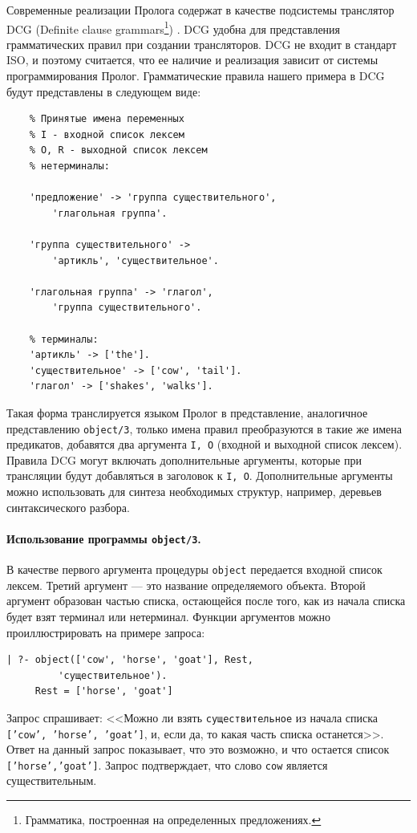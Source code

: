 \documentclass[12pt, openany, twoside]{book} %
\begin{document}
Современные реализации Пролога содержат в качестве подсистемы транслятор DCG (Definite clause grammars\footnote{Грамматика, построенная на определенных предложениях.}) \cite{WIKI-DCG}.  DCG удобна для представления грамматических правил при создании трансляторов. DCG не входит в стандарт ISO, и поэтому считается, что ее наличие и реализация зависит от системы программирования Пролог. Грамматические правила нашего примера в DCG будут представлены в следующем виде:
{\tt\begin{verbatim}
    % Принятые имена переменных
    % I - входной список лексем
    % О, R - выходной список лексем
    % нетерминалы:

    'предложение' -> 'группа существительного',
        'глагольная группа'.

    'группа существительного' ->
        'артикль', 'существительное'.

    'глагольная группа' -> 'глагол',
        'группа существительного'.

    % терминалы:
    'артикль' -> ['the'].
    'существительное' -> ['cow', 'tail'].
    'глагол' -> ['shakes', 'walks'].
\end{verbatim}}
\noindent{} Такая форма транслируется языком Пролог в представление, аналогичное представлению \texttt{object/3}, только имена правил преобразуются в такие же имена предикатов, добавятся два аргумента \texttt{I, O} (входной и выходной список лексем). Правила DCG могут включать дополнительные аргументы, которые при трансляции будут добавляться в заголовок к \texttt{I, O}. Дополнительные аргументы можно использовать для синтеза необходимых структур, например, деревьев синтаксического разбора.

\paragraph{Использование программы {\tt object/3}.} В качестве первого аргумента процедуры {\tt object} передается входной список лексем. Третий аргумент --- это название определяемого объекта. Второй аргумент образован частью списка, остающейся после того, как из начала списка будет взят терминал или нетерминал. Функции аргументов можно проиллюстрировать на примере запроса:

{\tt\begin{verbatim}
| ?- object(['cow', 'horse', 'goat'], Rest,
         'существительное').
     Rest = ['horse', 'goat']
\end{verbatim}}

Запрос спрашивает: <<Можно ли взять {\tt существительное} из начала списка {\tt ['cow', 'horse', 'goat']}, и, если да, то какая часть списка останется>>. Ответ на данный запрос показывает, что это возможно, и что остается список {\tt ['horse','goat']}. Запрос подтверждает, что слово {\tt cow} является существительным.
\end{document}
